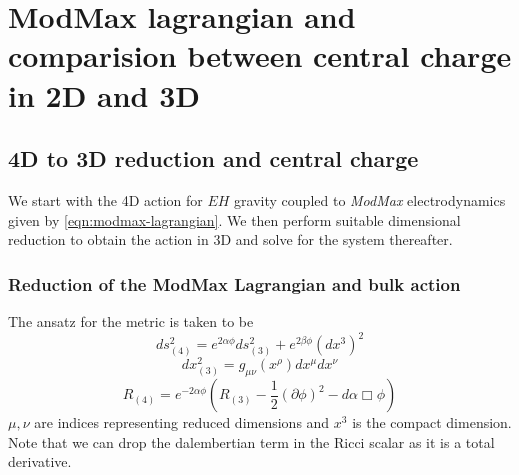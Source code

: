 
\chapter{ModMax lagrangian and comparision between central charge in 2D and 3D} %

\label{Chapter3} %



\section{4D to 3D reduction and central charge}
We start with the 4D action for $EH$ gravity coupled to \textit{ModMax} electrodynamics \cite{rathi2023ads2} given by \ref{eqn:modmax-lagrangian}. We then perform suitable dimensional reduction to obtain the action in 3D and solve for the system thereafter. 


\subsection{Reduction of the ModMax Lagrangian and bulk action}
\label{subsec:modmax-4d-to-3d}
The ansatz for the metric is taken to be 
\begin{equation}
    \label{eqn:4d-3d-metric-ansatz}
    ds_{(4)}^2 = e^{2\alpha\phi}ds_{(3)}^2+e^{2\beta\phi}(dx^3)^2
\end{equation}
\begin{equation}
    dx_{(3)}^2 = g_{\mu\nu}(x^\rho)dx^\mu dx^\nu
\end{equation}
\begin{equation}
    R_{(4)} = e^{-2\alpha\phi} \left ( R_{(3)} - \frac{1}{2} (\partial\phi)^2 - d\alpha \Box\phi \right )
\end{equation}
$\mu, \nu$ are indices representing reduced dimensions and $x^3$ is the compact dimension. Note that we can drop the dalembertian term in the Ricci scalar as it is a total derivative. 

